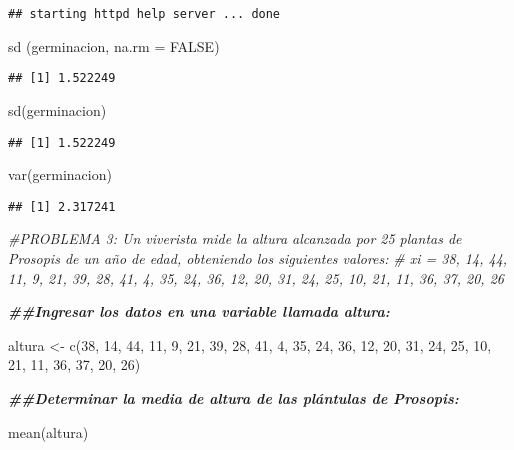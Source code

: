 \documentclass[
]{article}
\newenvironment{Shaded}{\begin{snugshade}}{\end{snugshade}}
\newcommand{\AttributeTok}[1]{\textcolor[rgb]{0.77,0.63,0.00}{#1}}
\newcommand{\CommentTok}[1]{\textcolor[rgb]{0.56,0.35,0.01}{\textit{#1}}}
\newcommand{\ConstantTok}[1]{\textcolor[rgb]{0.00,0.00,0.00}{#1}}
\newcommand{\DecValTok}[1]{\textcolor[rgb]{0.00,0.00,0.81}{#1}}
\newcommand{\DocumentationTok}[1]{\textcolor[rgb]{0.56,0.35,0.01}{\textbf{\textit{#1}}}}
\newcommand{\FunctionTok}[1]{\textcolor[rgb]{0.00,0.00,0.00}{#1}}
\newcommand{\NormalTok}[1]{#1}
\newcommand{\OtherTok}[1]{\textcolor[rgb]{0.56,0.35,0.01}{#1}}
\begin{document}
\begin{verbatim}
## starting httpd help server ... done
\end{verbatim}

\begin{Shaded}
\begin{Highlighting}[]
\FunctionTok{sd}\NormalTok{ (germinacion, }\AttributeTok{na.rm =} \ConstantTok{FALSE}\NormalTok{)}
\end{Highlighting}
\end{Shaded}

\begin{verbatim}
## [1] 1.522249
\end{verbatim}

\begin{Shaded}
\begin{Highlighting}[]
\FunctionTok{sd}\NormalTok{(germinacion)}
\end{Highlighting}
\end{Shaded}

\begin{verbatim}
## [1] 1.522249
\end{verbatim}

\begin{Shaded}
\begin{Highlighting}[]
\FunctionTok{var}\NormalTok{(germinacion)}
\end{Highlighting}
\end{Shaded}

\begin{verbatim}
## [1] 2.317241
\end{verbatim}

\begin{Shaded}
\begin{Highlighting}[]
\CommentTok{\#PROBLEMA 3: Un viverista mide la altura alcanzada por 25 plantas de Prosopis de un año de edad, obteniendo los siguientes valores:}
\CommentTok{\# xi = 38, 14, 44, 11, 9, 21, 39, 28, 41, 4, 35, 24, 36, 12, 20, 31, 24, 25, 10, 21, 11, 36, 37, 20, 26}

\DocumentationTok{\#\#Ingresar los datos en una variable llamada altura:}

\NormalTok{altura }\OtherTok{\textless{}{-}} \FunctionTok{c}\NormalTok{(}\DecValTok{38}\NormalTok{, }\DecValTok{14}\NormalTok{, }\DecValTok{44}\NormalTok{, }\DecValTok{11}\NormalTok{, }\DecValTok{9}\NormalTok{, }\DecValTok{21}\NormalTok{, }\DecValTok{39}\NormalTok{, }\DecValTok{28}\NormalTok{, }\DecValTok{41}\NormalTok{, }\DecValTok{4}\NormalTok{, }\DecValTok{35}\NormalTok{, }\DecValTok{24}\NormalTok{, }\DecValTok{36}\NormalTok{, }\DecValTok{12}\NormalTok{, }\DecValTok{20}\NormalTok{, }\DecValTok{31}\NormalTok{, }\DecValTok{24}\NormalTok{, }\DecValTok{25}\NormalTok{, }\DecValTok{10}\NormalTok{, }\DecValTok{21}\NormalTok{, }\DecValTok{11}\NormalTok{, }\DecValTok{36}\NormalTok{, }\DecValTok{37}\NormalTok{, }\DecValTok{20}\NormalTok{, }\DecValTok{26}\NormalTok{)}

\DocumentationTok{\#\#Determinar la media de altura de las plántulas de Prosopis:}

\FunctionTok{mean}\NormalTok{(altura)}
\end{Highlighting}
\end{Shaded}
\end{document}
